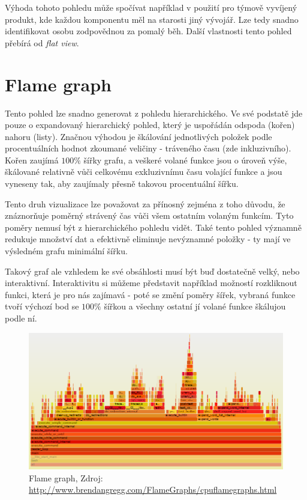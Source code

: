 \documentclass[czech,BP]{thesiskiv}
\begin{document}
Výhoda tohoto pohledu může spočívat například v použití pro týmově vyvíjený produkt, kde každou komponentu měl na starosti jiný vývojář. Lze tedy snadno identifikovat osobu zodpovědnou za pomalý běh. Další vlastnosti tento pohled přebírá od \emph{flat view}.

\section{Flame graph}

Tento pohled lze snadno generovat z pohledu hierarchického. Ve své podstatě jde pouze o expandovaný hierarchický pohled, který je uspořádán odspoda (kořen) nahoru (listy). Značnou výhodou je škálování jednotlivých položek podle procentuálních hodnot zkoumané veličiny - tráveného času (zde inkluzivního). Kořen zaujímá $100\%$ šířky grafu, a veškeré volané funkce jsou o úroveň výše, škálované relativně vůči celkovému exkluzivnímu času volající funkce a jsou vyneseny tak, aby zaujímaly přesně takovou procentuální šířku.

Tento druh vizualizace lze považovat za přínosný zejména z toho důvodu, že znáznorňuje poměrný strávený čas vůči všem ostatním volaným funkcím. Tyto poměry nemusí být z hierarchického pohledu vidět. Také tento pohled významně redukuje množství dat a efektivně eliminuje nevýznamné položky - ty mají ve výsledném grafu minimální šířku.

Takový graf ale vzhledem ke své obsáhlosti musí být buď dostatečně velký, nebo interaktivní. Interaktivitu si můžeme představit například možností rozkliknout funkci, která je pro nás zajímavá - poté se změní poměry šířek, vybraná funkce tvoří výchozí bod se $100\%$ šířkou a všechny ostatní jí volané funkce škálujou podle ní.

\begin{figure}[h]
    \centering
    \includegraphics[interpolate,width=1.0\textwidth]{img/prof_flame.png}
    \caption{Flame graph, Zdroj: \url{http://www.brendangregg.com/FlameGraphs/cpuflamegraphs.html} }
    \label{obr:flamegr}
\end{figure}
\end{document}
